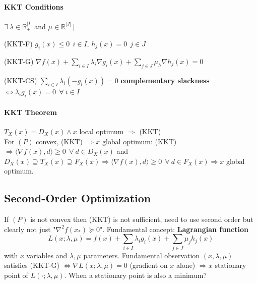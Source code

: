 \documentclass[10pt]{report}
\begin{document}
\paragraph{KKT Conditions} $\exists\:\lambda\in \mathbb{R}_+^{|I|}$ and $\mu\in \mathbb{R}^{|J|}\:|$\begin{list}{}{}
	\item[(KKT-F)] $g_i(x)\leq 0\:\:i\in I$, $h_j(x) = 0\:\:j\in J$
	\item[(KKT-G)] $\nabla f(x) + \sum_{i\in I}\lambda_i\nabla g_i(x) + \sum_{j\in J}\mu_h\nabla h_j(x) = 0$
	\item[(KKT-CS)] $\sum_{i\in I}\lambda_i(-g_i(x)) = 0$ \textbf{complementary slackness} $\Leftrightarrow \lambda_ig_i(x) = 0\:\:\forall\:i\in I$
\end{list}
\paragraph{KKT Theorem} $T_X(x)=D_X(x)\wedge x$ local optimum $\Rightarrow$ (KKT)\\
For $(P)$ convex, (KKT) $\Rightarrow x$ global optimum: (KKT) $\Rightarrow \langle \nabla f(x), d\rangle \geq 0\:\:\forall\:d\in D_X(x)$ and $D_X(x)\supseteq T_X(x)\supseteq F_X(x) \Rightarrow\langle \nabla f(x), d\rangle \geq 0\:\:\forall\:d\in F_X(x)\Rightarrow x$ global optimum.
\subsection{Second-Order Optimization}
If $(P)$ is not convex then (KKT) is not sufficient, need to use second order but clearly not just "$\nabla^2 f(x_*)\succeq 0$". Fundamental concept: \textbf{Lagrangian function} $$L(x;\lambda, \mu)=f(x) + \sum_{i\in I} \lambda_ig_i(x) + \sum_{j\in J}\mu_jh_j(x)$$ with $x$ variables and $\lambda,\mu$ parameters. Fundamental observation $(x,\lambda,\mu)$ satisfies (KKT-G) $\Leftrightarrow \nabla L(x;\lambda,\mu) = 0$ (gradient on $x$ alone) $\Rightarrow x$ stationary point of $L(\cdot;\lambda,\mu)$. When a stationary point is also a minimum?
\end{document}
